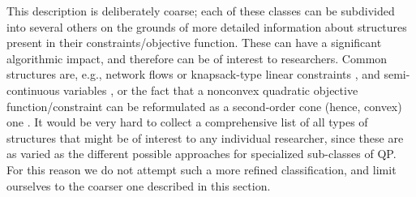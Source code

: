 %
This description is deliberately coarse; each of these classes can be subdivided into several others on the grounds of more detailed information about structures present in their constraints/objective function. These can have a significant algorithmic impact, and therefore can be of interest to researchers. Common structures are, e.g., network flows \cite{FrFG16,FrGaSc14,FrGaSt16a,FGGP11,tadayon-smith:2013} or knapsack-type linear constraints \cite{FrFG16,FrGo13b,FGGP11}, and semi-continuous variables \cite{FrFG16,FrGaSc14,FrGaSt16a,FrGe06a,FrGe07a,FrGe09a,FGGP11}
,
or the fact that a nonconvex quadratic objective function/constraint can be reformulated as a second-order cone (hence, convex) one \cite{FrFG16,FrGaSc14,FrGaSt16a,FrGe09a,FGGP11}
.
It would be very hard to collect a comprehensive list of all types of structures that might be of interest to any individual researcher, since these are as varied as the different possible approaches for specialized sub-classes of QP. For this reason we do not attempt such a more refined classification, and limit ourselves to the coarser one described in this section.

